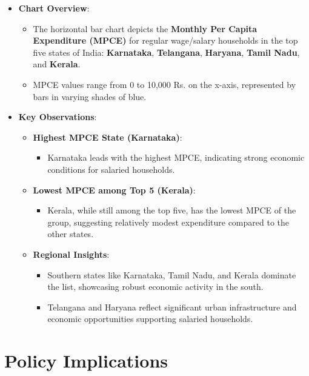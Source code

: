 \documentclass{article}
\begin{document}
\begin{itemize}
	\item \textbf{Chart Overview}:
	\begin{itemize}
		\item The horizontal bar chart depicts the \textbf{Monthly Per Capita Expenditure (MPCE)} for regular wage/salary households in the top five states of India: \textbf{Karnataka}, \textbf{Telangana}, \textbf{Haryana}, \textbf{Tamil Nadu}, and \textbf{Kerala}.
		\item MPCE values range from 0 to 10,000 Rs. on the x-axis, represented by bars in varying shades of blue.
	\end{itemize}
	\item \textbf{Key Observations}:
	\begin{itemize}
		\item \textbf{Highest MPCE State (Karnataka)}:
		\begin{itemize}
			\item Karnataka leads with the highest MPCE, indicating strong economic conditions for salaried households.
		\end{itemize}
		\item \textbf{Lowest MPCE among Top 5 (Kerala)}:
		\begin{itemize}
			\item Kerala, while still among the top five, has the lowest MPCE of the group, suggesting relatively modest expenditure compared to the other states.
		\end{itemize}
		\item \textbf{Regional Insights}:
		\begin{itemize}
			\item Southern states like Karnataka, Tamil Nadu, and Kerala dominate the list, showcasing robust economic activity in the south.
			\item Telangana and Haryana reflect significant urban infrastructure and economic opportunities supporting salaried households.
		\end{itemize}
	\end{itemize}
\end{itemize}

\section*{Policy Implications}
\end{document}
